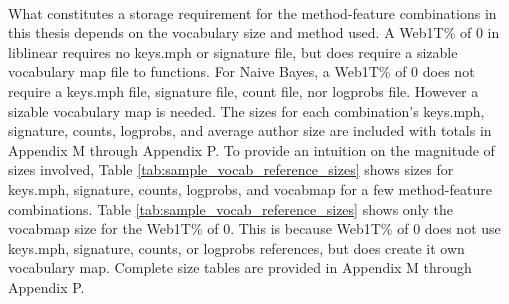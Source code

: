 	\paragraph*{} What constitutes a storage requirement for the method-feature combinations in this thesis depends on the vocabulary size and method used.  A Web1T\% of 0 in liblinear requires no keys.mph or signature file, but does require a sizable vocabulary map file to functions.  For Naive Bayes, a Web1T\% of 0 does not require a keys.mph file, signature file, count file, nor logprobs file.  However a sizable vocabulary map is needed.  The sizes for each combination's keys.mph, signature, counts, logprobs, and average author size are included with totals in Appendix M through Appendix P.  To provide an intuition on the magnitude of sizes involved, Table \ref{tab:sample_vocab_reference_sizes} shows sizes for keys.mph, signature, counts, logprobs, and vocabmap for a few method-feature combinations.  Table \ref{tab:sample_vocab_reference_sizes} shows only the vocabmap size for the Web1T\% of 0.  This is because Web1T\% of 0 does not use keys.mph, signature, counts, or logprobs references, but does create it own vocabulary map.  Complete size tables are provided in Appendix M through Appendix P.
	
